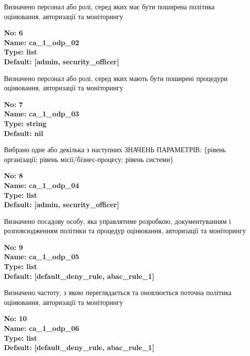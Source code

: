 \documentclass{article}
\begin{document}
{\footnotesize Визначено персонал або ролі, серед яких має бути поширена політика оцінювання, авторизації та моніторингу}


{\footnotesize\bfseries
No: 6\\
Name: ca\_\allowbreak{}1\_\allowbreak{}odp\_\allowbreak{}02\\
Type: list\\
Default: [\textquotedbl{}admin\textquotedbl{}, \textquotedbl{}security\_\allowbreak{}officer\textquotedbl{}]
}

{\footnotesize Визначено персонал або ролі, серед яких мають бути поширені процедури оцінювання, авторизації та моніторингу}


{\footnotesize\bfseries
No: 7\\
Name: ca\_\allowbreak{}1\_\allowbreak{}odp\_\allowbreak{}03\\
Type: string\\
Default: nil
}

{\footnotesize Вибрано одне або декілька з наступних ЗНАЧЕНЬ ПАРАМЕТРІВ: \{рівень організації; рівень місії/бізнес-процесу; рівень системи\}}


{\footnotesize\bfseries
No: 8\\
Name: ca\_\allowbreak{}1\_\allowbreak{}odp\_\allowbreak{}04\\
Type: list\\
Default: [\textquotedbl{}admin\textquotedbl{}, \textquotedbl{}security\_\allowbreak{}officer\textquotedbl{}]
}

{\footnotesize Визначено посадову особу, яка управлятиме розробкою, документуванням і розповсюдженням політики та процедур оцінювання, авторизації та моніторингу}


{\footnotesize\bfseries
No: 9\\
Name: ca\_\allowbreak{}1\_\allowbreak{}odp\_\allowbreak{}05\\
Type: list\\
Default: [\textquotedbl{}default\_\allowbreak{}deny\_\allowbreak{}rule\textquotedbl{}, \textquotedbl{}abac\_\allowbreak{}rule\_\allowbreak{}1\textquotedbl{}]
}

{\footnotesize Визначено частоту, з якою переглядається та оновлюється поточна політика оцінювання, авторизації та моніторингу}


{\footnotesize\bfseries
No: 10\\
Name: ca\_\allowbreak{}1\_\allowbreak{}odp\_\allowbreak{}06\\
Type: list\\
Default: [\textquotedbl{}default\_\allowbreak{}deny\_\allowbreak{}rule\textquotedbl{}, \textquotedbl{}abac\_\allowbreak{}rule\_\allowbreak{}1\textquotedbl{}]
}
\end{document}
